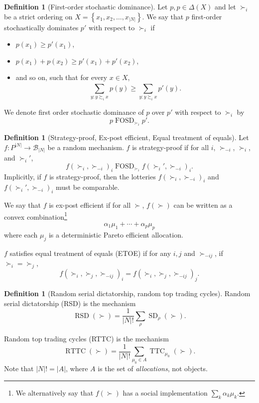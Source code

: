 \documentclass[10pt]{article}
\numberwithin{equation}{section}
\DeclareMathOperator{\FOSD}{FOSD}
\DeclareMathOperator{\RSD}{RSD}
\DeclareMathOperator{\SD}{SD}
\DeclareMathOperator{\TTC}{TTC}
\DeclareMathOperator{\RTTC}{RTTC}
\theoremstyle{definition}
\newtheorem{definition}[theorem]{Definition}
\begin{document}
\begin{definition}[First-order stochastic dominance]
	Let $p,p \in \Delta(X)$ and let $\succ_i$ be a strict ordering on $X = \left\{x_1,x_2,\ldots,x_{\left| N \right|}\right\}$.
	We say that $p$ first-order stochastically dominates $p'$ with respect to $\succ_i$ if\begin{itemize}
		\item $p(x_1) \ge p'(x_1)$,
		\item $p(x_1) + p(x_2) \ge p'(x_1) + p'(x_2)$,
		\item and so on, such that for every $x \in X$, \[
				\sum\limits_{y : y \succsim_i x} p(y) \ge \sum\limits_{y: y \succsim_i x}^{} p'(y)
		.\] 
	\end{itemize}
	We denote first order stochastic dominance of $p$ over $p'$ with respect to $\succ_i$ by \[
		p \FOSD_{\succ_i}p'
	.\] 
\end{definition}

\begin{definition}[Strategy-proof, Ex-post efficient, Equal treatment of equals]
	Let $f: P^{\left| N \right|}\to \mathscr{B}_{\left| N \right|}$ be a random mechanism. $f$ is strategy-proof if for all $i$, $\succ_{-i}$, $\succ_i$, and $\succ_{i}'$,
	\[
		f(\succ_i,\succ_{-i})_i \FOSD_{\succ_i} f(\succ_i', \succ_{-i})_i
	.\]Implicitly, if $f$ is strategy-proof, then the lotteries $f(\succ_i,\succ_{-i})_i$ and $f(\succ_i',\succ_{-i})_i$ must be comparable.

	We say that $f$ is ex-post efficient if for all $\succ$, $f(\succ)$ can be written as a convex combination\footnote{We alternatively say that $f(\succ)$ has a social implementation $\sum_k \alpha_k \mu_k$.} \[
		\alpha_1 \mu_1 + \cdots + \alpha_p \mu_p
	\] where each $\mu_j$ is a deterministic Pareto efficient allocation.

	$f$ satisfies equal treatment of equals (ETOE) if for any $i,j$ and $\succ_{-ij}$, if $\succ_i = \succ_j$, \[
		f(\succ_i,\succ_j,\succ_{-ij})_i = f\left( \succ_i,\succ_j,\succ_{-ij} \right)_{j}
	.\]  
\end{definition}

\begin{definition}[Random serial dictatorship, random top trading cycles]
	Random serial dictatorship (RSD) is the mechanism \[
		\RSD(\succ) = \frac{1}{\left| N \right|!} \sum\limits_{\rho}^{} \SD_\rho(\succ)
	.\] 

	Random top trading cycles (RTTC) is the mechanism \[
		\RTTC(\succ) = \frac{1}{\left| N \right|!} \sum\limits_{\mu_0 \in A}^{} \TTC_{\mu_0}(\succ)
	.\] Note that $\left| N \right|! = \left| A \right|$, where $A$ is the set of \emph{allocations}, not objects.
\end{definition}
\end{document}
